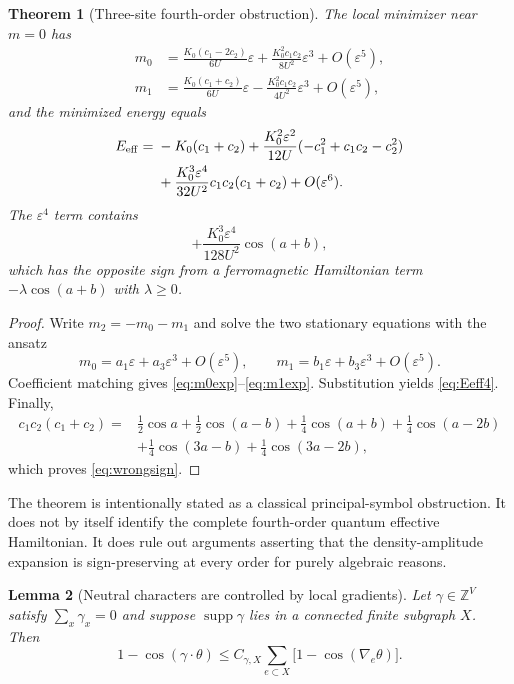 \documentclass[11pt]{article}
\newtheorem{theorem}{Theorem}[section]
\newtheorem{lemma}[theorem]{Lemma}
\newcommand{\supp}{\operatorname{supp}}
\begin{document}
\begin{theorem}[Three-site fourth-order obstruction]
The local minimizer near $m=0$ has
\begin{align}
m_0&=\frac{K_0(c_1-2c_2)}{6U}\varepsilon
+\frac{K_0^2c_1c_2}{8U^2}\varepsilon^3
+O(\varepsilon^5),
\label{eq:m0exp}\\
m_1&=\frac{K_0(c_1+c_2)}{6U}\varepsilon
-\frac{K_0^2c_1c_2}{4U^2}\varepsilon^3
+O(\varepsilon^5),
\label{eq:m1exp}
\end{align}
and the minimized energy equals
\begin{align}
E_{\mathrm{eff}}
={}&-K_0(c_1+c_2)
+\frac{K_0^2\varepsilon^2}{12U}
(-c_1^2+c_1c_2-c_2^2)
\notag\\
&+\frac{K_0^3\varepsilon^4}{32U^2}
c_1c_2(c_1+c_2)
+O(\varepsilon^6).
\label{eq:Eeff4}
\end{align}
The $\varepsilon^4$ term contains
\begin{equation}
+\frac{K_0^3\varepsilon^4}{128U^2}\cos(a+b),
\label{eq:wrongsign}
\end{equation}
which has the opposite sign from a ferromagnetic Hamiltonian term $-\lambda\cos(a+b)$ with $\lambda\ge0$.
\end{theorem}

\begin{proof}
Write $m_2=-m_0-m_1$ and solve the two stationary equations with the ansatz
\[
m_0=a_1\varepsilon+a_3\varepsilon^3+O(\varepsilon^5),
\qquad
m_1=b_1\varepsilon+b_3\varepsilon^3+O(\varepsilon^5).
\]
Coefficient matching gives \eqref{eq:m0exp}--\eqref{eq:m1exp}. Substitution yields \eqref{eq:Eeff4}. Finally,
\begin{align*}
c_1c_2(c_1+c_2)
={}&\frac12\cos a+\frac12\cos(a-b)
+\frac14\cos(a+b)+\frac14\cos(a-2b)\\
&+\frac14\cos(3a-b)+\frac14\cos(3a-2b),
\end{align*}
which proves \eqref{eq:wrongsign}.
\end{proof}

The theorem is intentionally stated as a classical principal-symbol obstruction. It does not by itself identify the complete fourth-order quantum effective Hamiltonian. It does rule out arguments asserting that the density-amplitude expansion is sign-preserving at every order for purely algebraic reasons.

\begin{lemma}[Neutral characters are controlled by local gradients]
Let $\gamma\in\mathbb Z^V$ satisfy $\sum_x\gamma_x=0$ and suppose $\supp\gamma$ lies in a connected finite subgraph $X$. Then
\begin{equation}
1-\cos(\gamma\cdot\theta)
\le C_{\gamma,X}\sum_{e\subset X}
\bigl[1-\cos(\nabla_e\theta)\bigr].
\label{eq:neutralgradient}
\end{equation}
\end{lemma}
\end{document}
